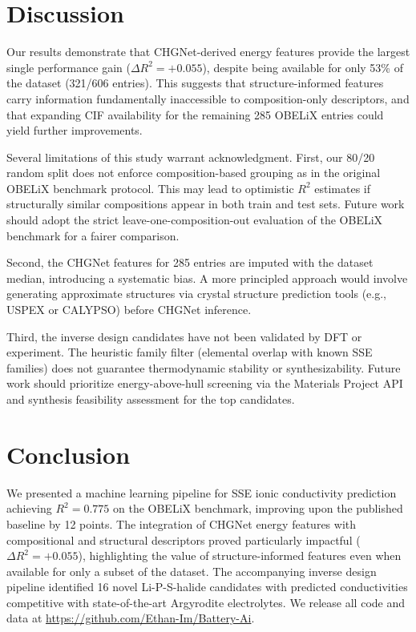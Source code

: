\documentclass[12pt]{article}
\begin{document}
\section{Discussion}

Our results demonstrate that CHGNet-derived energy features provide the largest
single performance gain ($\Delta R^2 = +0.055$), despite being available for only
53\% of the dataset (321/606 entries). This suggests that structure-informed features
carry information fundamentally inaccessible to composition-only descriptors, and
that expanding CIF availability for the remaining 285 OBELiX entries could yield
further improvements.

Several limitations of this study warrant acknowledgment. First, our 80/20 random
split does not enforce composition-based grouping as in the original OBELiX benchmark
protocol. This may lead to optimistic $R^2$ estimates if structurally similar
compositions appear in both train and test sets. Future work should adopt the strict
leave-one-composition-out evaluation of the OBELiX benchmark for a fairer comparison.

Second, the CHGNet features for 285 entries are imputed with the dataset median,
introducing a systematic bias. A more principled approach would involve generating
approximate structures via crystal structure prediction tools (e.g., USPEX or CALYPSO)
before CHGNet inference.

Third, the inverse design candidates have not been validated by DFT or experiment.
The heuristic family filter (elemental overlap with known SSE families) does not
guarantee thermodynamic stability or synthesizability. Future work should prioritize
energy-above-hull screening via the Materials Project API \cite{jain2013mp} and
synthesis feasibility assessment for the top candidates.

\section{Conclusion}

We presented a machine learning pipeline for SSE ionic conductivity prediction
achieving $R^2 = 0.775$ on the OBELiX benchmark, improving upon the published
baseline by 12 points. The integration of CHGNet energy features with compositional
and structural descriptors proved particularly impactful ($\Delta R^2 = +0.055$),
highlighting the value of structure-informed features even when available for only
a subset of the dataset. The accompanying inverse design pipeline identified 16 novel
Li-P-S-halide candidates with predicted conductivities competitive with state-of-the-art
Argyrodite electrolytes. We release all code and data at
\url{https://github.com/Ethan-Im/Battery-Ai}.



\end{document}
